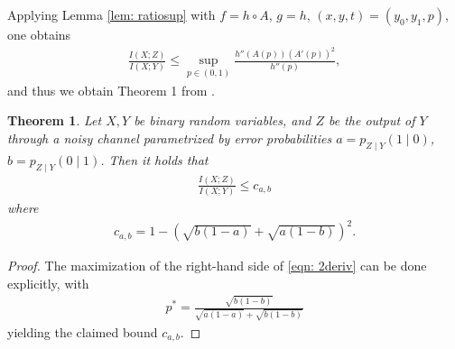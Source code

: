\documentclass[12pt,reqno]{amsart}
\theoremstyle{plain} %
\newtheorem{theorem}{Theorem}[section]
\theoremstyle{remark}
\theoremstyle{definition}
\begin{document}
Applying Lemma \ref{lem: ratiosup} with $f=h\circ A$, $g=h$, $(x,y,t)=(y_0,y_1,p)$, one obtains
\begin{align}\label{eqn: 2deriv}
    \frac{I(X;Z)}{I(X;Y)}\le\sup_{p\in(0,1)}\frac{h''(A(p))(A'(p))^2}{h''(p)},
\end{align}
and thus we obtain Theorem 1 from \cite{ES}.
\begin{theorem}\label{thm: gatespdi}
    Let $X,Y$ be binary random variables, and $Z$ be the output of $Y$ through a noisy channel parametrized by error probabilities $a=p_{Z\mid Y}(1\mid 0)$, $b=p_{Z\mid Y}(0\mid 1)$. Then it holds that 
    \begin{align}
        \frac{I(X;Z)}{I(X;Y)}\le c_{a,b}
    \end{align}
    where 
    \begin{align}
        c_{a,b}=1-\left(\sqrt{b(1-a)}+\sqrt{a(1-b)}\right)^2.
    \end{align}
\end{theorem}
\begin{proof}
    The maximization of the right-hand side of \eqref{eqn: 2deriv} can be done explicitly, with 
    \begin{align}\label{eqn: optimalrate}
        p^*=\frac{\sqrt{b(1-b)}}{\sqrt{a(1-a)}+\sqrt{b(1-b)}}
    \end{align}
    yielding the claimed bound $c_{a,b}$.
\end{proof}
\end{document}
